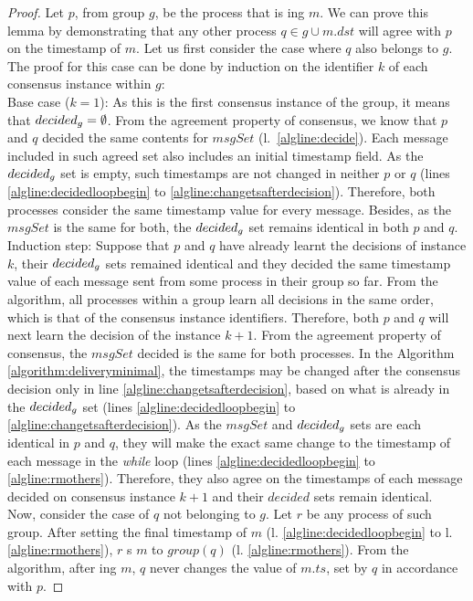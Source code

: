 \documentclass[times, 10pt]{article}
\begin{document}
\begin{proof}
Let $p$, from group $g$, be the process that is \amcast{}ing $m$. We can prove this lemma by demonstrating that any other process $q \in g \cup m.dst$ will agree with $p$ on the timestamp of $m$. Let us first consider the case where $q$ also belongs to $g$. The proof for this case can be done by induction on the identifier $k$ of each consensus instance within $g$:\\

\noindent Base case ($k=1$): As this is the first consensus instance of the group, it means that $decided\text{$_g$} = \emptyset$. From the agreement property of consensus, we know that $p$ and $q$ decided the same contents for $msgSet$ \mbox{(l. \ref{algline:decide})}. Each message included in such agreed set also includes an initial timestamp field. As the $decided\text{$_g$}$ set is empty, such timestamps are not changed in neither $p$ or $q$ (lines \ref{algline:decidedloopbegin} to \ref{algline:changetsafterdecision}). Therefore, both processes consider the same timestamp value for every message. Besides, as the $msgSet$ is the same for both, the $decided\text{$_g$}$ set remains identical in both $p$ and $q$.\\

\noindent Induction step: Suppose that $p$ and $q$ have already learnt the decisions of instance $k$, their $decided\text{$_g$}$ sets remained identical and they decided the same timestamp value of each message sent from some process in their group so far. From the algorithm, all processes within a group learn all decisions in the same order, which is that of the consensus instance identifiers. Therefore, both $p$ and $q$ will next learn the decision of the instance $k+1$. From the agreement property of consensus, the $msgSet$ decided is the same for both processes. In the Algorithm \ref{algorithm:deliveryminimal}, the timestamps may be changed after the consensus decision only in line \ref{algline:changetsafterdecision}, based on what is already in the $decided\text{$_g$}$ set (lines \ref{algline:decidedloopbegin} to \ref{algline:changetsafterdecision}). As the $msgSet$ and $decided\text{$_g$}$ sets are each identical in $p$ and $q$, they will make the exact same change to the timestamp of each message in the \textit{while} loop (lines \ref{algline:decidedloopbegin} to \ref{algline:rmothers}). Therefore, they also agree on the timestamps of each message decided on consensus instance $k+1$ and their $decided$ sets remain identical.\\

Now, consider the case of $q$ not belonging to $g$. Let $r$ be any process of such group. After setting the final timestamp of $m$ (l. \ref{algline:decidedloopbegin} to l. \ref{algline:rmothers}), $r$ \rmcast{}s $m$ to $group(q)$ (l. \ref{algline:rmothers}). From the algorithm, after \rmdel{}ing $m$, $q$ never changes the value of $m.ts$, set by $q$ in accordance with $p$.%
\end{proof}
\end{document}
